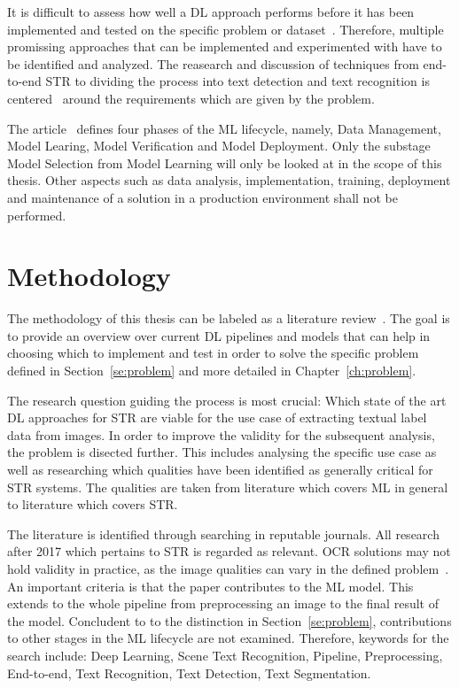 It is difficult to assess how well a \ac{DL} approach performs before it has been
implemented and tested on the specific problem or dataset~\citep{arpteg_software_2018}.
Therefore, multiple promissing approaches that can be implemented and experimented with have to
be identified and analyzed.
The reasearch and discussion of techniques from end-to-end \ac{STR} to dividing the
process into text detection and text recognition is centered~\cite{chen_text_2021} around the
requirements which are given by the problem.

The article~\cite{ashmore_assuring_2021} defines four phases of the \ac{ML} lifecycle, namely,
Data Management, Model Learing, Model Verification and Model Deployment.
Only the substage Model Selection from Model Learning will only be looked at in the scope of this
thesis.
Other aspects such as data analysis, implementation, training, deployment and maintenance of a
solution in a production environment shall not be performed.

\section{Methodology}\label{se:methodology}
The methodology of this thesis can be labeled as a literature review~\citep{snyder_literature_2019,
torraco_writing_2005}.
The goal is to provide an overview over current \ac{DL} pipelines and models that can help in
choosing which to implement and test in order to solve the specific problem defined in
Section~\ref{se:problem} and more detailed in Chapter~\ref{ch:problem}.

The research question guiding the process is most crucial: Which state of the art \ac{DL}
approaches for \ac{STR} are viable for the use case of extracting textual label data from
images.
In order to improve the validity for the subsequent analysis, the problem is disected further.
This includes analysing the specific use case as well as researching which qualities have been
identified as generally critical for \ac{STR} systems.
The qualities are taken from literature which covers \ac{ML} in general to literature
which covers \ac{STR}.

The literature is identified through searching in reputable journals.
All research after 2017 which pertains to \ac{STR} is regarded as relevant.
\ac{OCR} solutions may not hold validity in practice, as the image qualities can vary in the
defined problem~\citep{chen_text_2021}.
An important criteria is that the paper contributes to the \ac{ML} model.
This extends to the whole pipeline  from preprocessing an image to the final result of the model.
Concludent to to the distinction in Section~\ref{se:problem}, contributions to other stages in the
\ac{ML} lifecycle are not examined.
Therefore, keywords for the search include: Deep Learning, Scene Text Recognition, Pipeline,
Preprocessing, End-to-end, Text Recognition, Text Detection, Text Segmentation.

